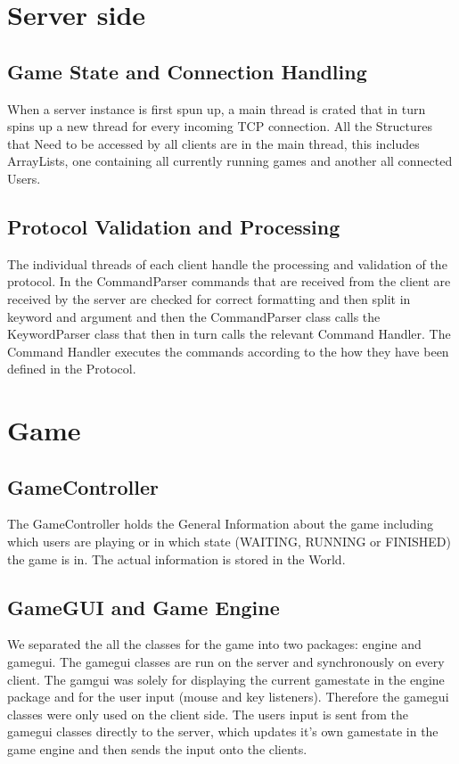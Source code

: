 \documentclass[11pt,a4paper]{article}
\begin{document}
	\section{Server side}
		\subsection{Game State and Connection Handling}
		When a server instance is first spun up, a main thread is crated that in turn spins up a new thread for every incoming TCP connection. All the Structures that Need to be accessed by all clients are in the main thread, this includes ArrayLists, one containing all currently running games and another all connected Users.
		\subsection{Protocol Validation and Processing}
		The individual threads of each client handle the processing and validation of the protocol. In the CommandParser commands that are received from the client are received by the server are checked for correct formatting and then split in keyword and argument and then the CommandParser class calls the KeywordParser class that then in turn calls the relevant Command Handler. The Command Handler executes the commands according to the how they have been defined in the Protocol.
		\clearpage 
	\section{Game}
		\subsection{GameController}
		The GameController holds the General Information about the game including which users are playing or in which state (WAITING, RUNNING or FINISHED) the game is in. The actual information is stored in the World.
		\subsection{GameGUI and Game Engine}
		We separated the all the classes for the game into two packages: engine and gamegui. The gamegui classes are run on the server and synchronously on every client. The gamgui was solely for displaying the current gamestate in the engine package and for the user input (mouse and key listeners). Therefore the gamegui classes were only used on the client side. The users input is sent from the gamegui classes directly to the server, which updates it's own gamestate in the game engine and then sends the input onto the clients.
\end{document}
